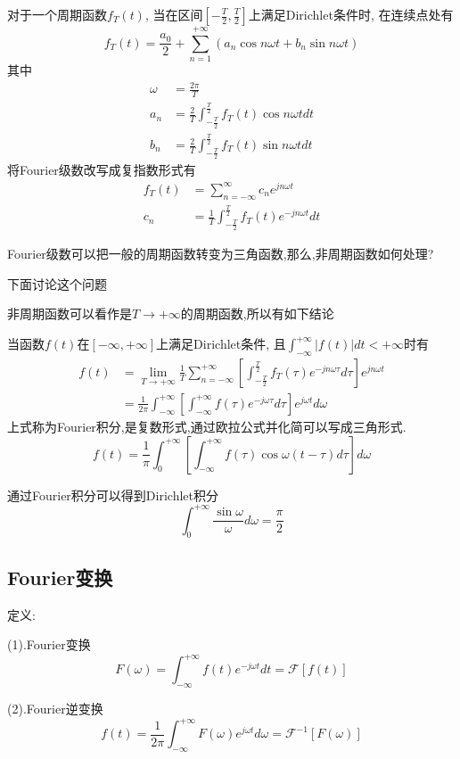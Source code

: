 \documentclass[12pt, a4paper, oneside]{ctexart}
\begin{document}
对于一个周期函数$f_T(t)$,
当在区间$[-\frac{T}{2},\frac{T}{2}]$上满足Dirichlet条件时,
在连续点处有
\[
    f_T(t) = \frac{a_0}{2} + \sum_{n = 1}^{+\infty}(a_n\cos n\omega t + b_n\sin n\omega t)
\]
其中
\begin{align*}
    \omega &= \frac{2\pi}{T}\\
    a_n &= \frac{2}{T}\int_{-\frac{T}{2}}^{\frac{T}{2}}f_T(t)\cos n\omega tdt\\
    b_n &= \frac{2}{T}\int_{-\frac{T}{2}}^{\frac{T}{2}}f_T(t)\sin n\omega tdt
\end{align*}
将Fourier级数改写成复指数形式有
\begin{align*}
    f_T(t) &= \sum_{n = -\infty}^{\infty}c_ne^{jn\omega t}\\
    c_n &= \frac{1}{T}\int_{-\frac{T}{2}}^{\frac{T}{2}}f_T(t)e^{-jn\omega t}dt
\end{align*}

Fourier级数可以把一般的周期函数转变为三角函数,那么,非周期函数如何处理?

下面讨论这个问题

非周期函数可以看作是$T \to +\infty$的周期函数,所以有如下结论

当函数$f(t)$在$[-\infty,+\infty]$上满足Dirichlet条件,
且$\int_{-\infty}^{+\infty}|f(t)|dt < +\infty$时有
\begin{align*}
    f(t) &= \lim_{T \to +\infty}\frac{1}{T}\sum_{n=-\infty}^{+\infty}\left[\int_{-\frac{T}{2}}^{\frac{T}{2}}f_T(\tau)e^{-jn\omega\tau}d\tau \right]e^{jn\omega t}\\
    &= \frac{1}{2\pi}\int_{-\infty}^{+\infty}\left[\int_{-\infty}^{+\infty}f(\tau)e^{-j\omega\tau}d\tau \right]e^{j\omega t}d\omega
\end{align*}
上式称为Fourier积分,是复数形式,通过欧拉公式并化简可以写成三角形式.
\[
    f(t) = \frac{1}{\pi}\int_{0}^{+\infty}\left[\int_{-\infty}^{+\infty}f(\tau)\cos \omega (t-\tau)d\tau \right]d\omega
\]

通过Fourier积分可以得到Dirichlet积分
$$
    \int_{0}^{+\infty}\frac{\sin\omega}{\omega}d\omega = \frac{\pi}{2}
$$
\subsection{Fourier变换}
定义:

(1).Fourier变换
\[
    F(\omega) = \int_{-\infty}^{+\infty}f(t)e^{-j\omega t}dt = \mathcal{F}[f(t)]
\]

(2).Fourier逆变换
\[
    f(t) = \frac{1}{2\pi}\int_{-\infty}^{+\infty}F(\omega)e^{j\omega t}d\omega = \mathcal{F}^{-1}[F(\omega)]
\]
\end{document}
